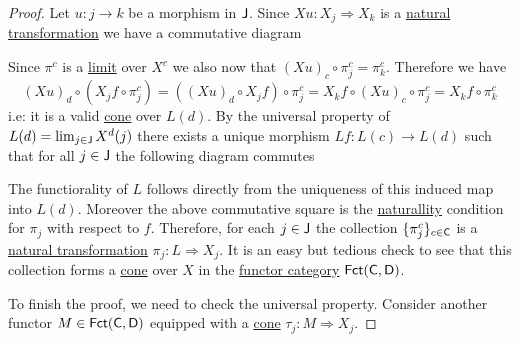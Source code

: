 \documentclass[../../main]{subfiles}
\begin{document}
\begin{proof}
  Let \(u\colon j \to k\) be a morphism in \(\mathsf{J}\).
  Since \(Xu\colon X_{j} \Rightarrow X_{k}\) is a \hyperref[def:natural-transformation]{natural transformation} we have a commutative diagram
  \begin{center}
  \end{center}
  Since \(\pi^{c}\) is a \hyperref[def:categorical-limit]{limit} over \(X^{c}\) we also now that \((Xu)_{c} \circ \pi_{j}^{c} = \pi_{k}^{c}\).
  Therefore we have
  \begin{equation*}
    (Xu)_{d} \circ (X_{j}f \circ \pi_{j}^{c}) = ((Xu)_{d} \circ X_{j}f) \circ \pi_{j}^{c} = X_{k}f \circ (Xu)_{c} \circ \pi_{j}^{c} = X_{k}f \circ \pi_{k}^{c}
  \end{equation*}
  i.e: it is a valid \hyperref[def:cone]{cone} over \(L(d)\).
  By the universal property of \(L(d) = \lim_{j \in \mathsf{J}} X^{d}(j)\) there exists a unique morphism \(Lf\colon L(c) \to L(d)\) such that for all \(j \in \mathsf{J}\) the following diagram commutes
  \begin{center}
  \end{center}

  The functiorality of \(L\) follows directly from the uniqueness of this induced map into \(L(d)\).
  Moreover the above commutative square is the \hyperref[def:natural-transformation]{naturallity} condition for \(\pi_{j}\) with respect to \(f\).
  Therefore, for each \(j \in \mathsf{J}\) the collection \(\{\pi_{j}^{c}\}_{c \in \mathsf{C}}\) is a \hyperref[def:natural-transformation]{natural transformation} \(\pi_{j}\colon L \Rightarrow X_{j}\).
  It is an easy but tedious check to see that this collection forms a \hyperref[def:cone]{cone} over \(X\) in the \hyperref[def:functor-category]{functor category} \(\mathsf{Fct}(\mathsf{C}, \mathsf{D})\).

  To finish the proof, we need to check the universal property.
  Consider another functor \(M \in \mathsf{Fct}(\mathsf{C}, \mathsf{D})\) equipped with a \hyperref[def:cone]{cone} \(\tau_{j}\colon M \Rightarrow X_{j}\).


\end{proof}
\end{document}
